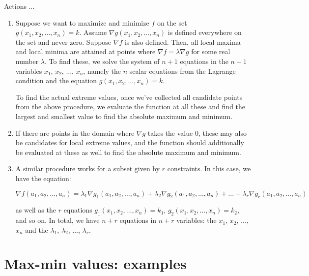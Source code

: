 \documentclass[10pt]{amsart}
\begin{document}
Actions ...

\begin{enumerate}
\item Suppose we want to maximize and minimize $f$ on the set
  $g(x_1,x_2,\dots,x_n) = k$. Assume $\nabla g(x_1,x_2,\dots,x_n)$ is
  defined everywhere on the set and never zero. Suppose $\nabla f$ is
  also defined. Then, all local maxima and local minima are attained
  at points where $\nabla f = \lambda \nabla g$ for some real number
  $\lambda$. To find these, we solve the system of $n + 1$ equations
  in the $n+1$ variables $x_1$, $x_2$, $\dots$, $x_n$, namely the $n$
  scalar equations from the Lagrange condition and the equation
  $g(x_1,x_2,\dots,x_n) = k$.

  To find the actual extreme values, once we've collected all
  candidate points from the above procedure, we evaluate the function
  at all these and find the largest and smallest value to find the
  absolute maximum and minimum.

\item If there are points in the domain where $\nabla g$ takes the
  value $0$, these may also be candidates for local extreme values,
  and the function should additionally be evaluated at these as well
  to find the absolute maximum and minimum.
\item A similar procedure works for a subset given by $r$
  constraints. In this case, we have the equation:

  $$\nabla f(a_1,a_2,\dots,a_n) = \lambda_1\nabla g_1(a_1,a_2,\dots,a_n) + \lambda_2\nabla g_2(a_1,a_2,\dots,a_n) + \dots + \lambda_r\nabla g_r(a_1,a_2,\dots,a_n)$$

  as well as the $r$ equations $g_1(x_1,x_2,\dots,x_n) = k_1$,
  $g_2(x_1,x_2,\dots,x_n) = k_2$, and so on. In total, we have
  $n + r$ equations in $n + r$ variables: the $x_1$, $x_2$, $\dots$,
  $x_n$ and the $\lambda_1$, $\lambda_2$, $\dots$, $\lambda_r$.
\end{enumerate}

\section{Max-min values: examples}
\end{document}
